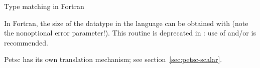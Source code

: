 \begin{comment}
In C, the \indexmpidef{MPI_Datatype} type is defined through the pre-processor,
allowing you to write:
\cverbatimsnippet{datatypevar}
\end{comment}

 {Type matching in Fortran}
\label{sec:mpi-type-match-f}

In Fortran, the size of the datatype in the language can be obtained with
 (note the nonoptional error parameter!).
This routine is deprecated in : use of
 and/or  is recommended.


Petsc has its own translation mechanism; see section~\ref{sec:petsc-scalar}.



